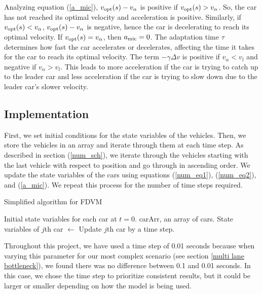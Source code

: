 \documentclass[12pt]{article}
\begin{document}
    Analyzing equation (\ref{a_mic}), $v_{\rm opt} (s) - v_\alpha$ is positive if $v_{\rm opt} (s) > v_\alpha$. So, the car has not reached its optimal velocity and acceleration is positive. Similarly, if  $v_{\rm opt} (s) < v_\alpha$, $v_{\rm opt} (s) - v_\alpha$ is negative, hence the car is decelerating to reach its optimal velocity. If $v_{\rm opt} (s) = v_\alpha$, then $a_{\rm mic} = 0$. The adaptation time $\tau$ determines how fast the car accelerates or decelerates, affecting the time it takes for the car to reach its optimal velocity. The term $-\gamma \Delta v$ is positive if $v_\alpha < v_l$ and negative if $v_\alpha > v_l$. This leads to more acceleration if the car is trying to catch up to the leader car and less acceleration if the car is trying to slow down due to the leader car's slower velocity. 
  
    \subsection{Implementation}\label{sec:implementation}
    First, we set initial conditions for the state variables of the vehicles. Then, we store the vehicles in an array and iterate through them at each time step. As described in section (\ref{num_sch}), we iterate through the vehicles starting with the last vehicle with respect to position and go through in ascending order. We update the state variables of the cars using equations (\ref{num_eq1}), (\ref{num_eq2}), and (\ref{a_mic}). We repeat this process for the number of time steps required. 
    \begin{algorithm}
      \caption{Simplified algorithm for FDVM}\label{alg:car-following}
      \begin{algorithmic}
      \Require Initial state variables for each car at $t=0$. 
      \Require carArr, an array of cars.
        \State State variables of $j$th car $\gets$ Update $j$th car by a time step.
        \EndFor
      \EndFor
      \end{algorithmic}
      \end{algorithm}
      
      Throughout this project, we have used a time step of 0.01 seconds because when varying this parameter for our most complex scenario (see section \ref{multi lane bottleneck}), we found there was no difference between 0.1 and 0.01 seconds. In this case, we chose the time step to prioritize consistent results, but it could be larger or smaller depending on how the model is being used.
      
\end{document}
